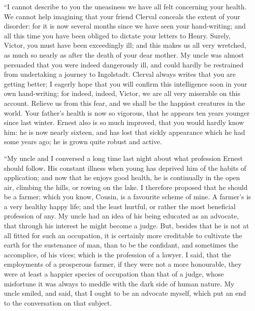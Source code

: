 ``I cannot describe to you the uneasiness
we have all felt concerning
your health. We cannot help imagining
that your friend Clerval conceals the extent
of your disorder: for it is now several
months since we have seen your
hand-writing; and all this time you have
been obliged to dictate your letters to
Henry. Surely, Victor, you must have
been exceedingly ill; and this makes us
all very wretched, as much so nearly as
after the death of your dear mother. My
uncle was almost persuaded that you
were indeed dangerously ill, and could
hardly be restrained from undertaking
a journey to Ingolstadt. Clerval always
writes that you are getting better; I
eagerly hope that you will confirm this
intelligence soon in your own hand-writing;
for indeed, indeed, Victor, we are
all very miserable on this account. Relieve
us from this fear, and we shall be
the happiest creatures in the world.
Your father's health is now so vigorous,
that he appears ten years younger since
last winter. Ernest also is so much
improved, that you would hardly know
him: he is now nearly sixteen, and has
lost that sickly appearance which he
had some years ago; he is grown quite
robust and active.

``My uncle and I conversed a long
time last night about what profession
Ernest should follow. His constant illness
when young has deprived him of
the habits of application; and now that
he enjoys good health, he is continually
in the open air, climbing the hills, or
rowing on the lake. I therefore proposed
that he should be a farmer;
which you know, Cousin, is a favourite
scheme of mine. A farmer's is a very
healthy happy life; and the least hurtful,
or rather the most beneficial profession
of any. My uncle had an idea
of his being educated as an advocate,
that through his interest he might become
a judge. But, besides that he is
not at all fitted for such an occupation,
it is certainly more creditable to cultivate
the earth for the sustenance of man,
than to be the confidant, and sometimes
the accomplice, of his vices; which is
the profession of a lawyer. I said, that
the employments of a prosperous farmer,
if they were not a more honourable,
they were at least a happier species
of occupation than that of a judge,
whose misfortune it was always to meddle
with the dark side of human nature.
My uncle smiled, and said, that
I ought to be an advocate myself, which
put an end to the conversation on that
subject.

